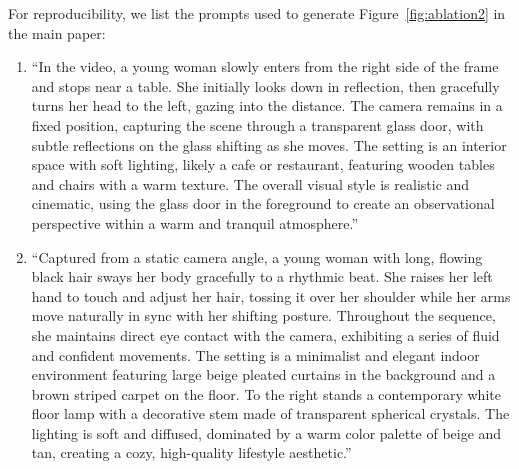 For reproducibility, we list the prompts used to generate Figure~\ref{fig:ablation2} in the main paper:
\begin{enumerate}
\item ``In the video, a young woman slowly enters from the right side of the frame and stops near a table. She initially looks down in reflection, then gracefully turns her head to the left, gazing into the distance. The camera remains in a fixed position, capturing the scene through a transparent glass door, with subtle reflections on the glass shifting as she moves. The setting is an interior space with soft lighting, likely a cafe or restaurant, featuring wooden tables and chairs with a warm texture. The overall visual style is realistic and cinematic, using the glass door in the foreground to create an observational perspective within a warm and tranquil atmosphere.''
% 
\item ``Captured from a static camera angle, a young woman with long, flowing black hair sways her body gracefully to a rhythmic beat. She raises her left hand to touch and adjust her hair, tossing it over her shoulder while her arms move naturally in sync with her shifting posture. Throughout the sequence, she maintains direct eye contact with the camera, exhibiting a series of fluid and confident movements. The setting is a minimalist and elegant indoor environment featuring large beige pleated curtains in the background and a brown striped carpet on the floor. To the right stands a contemporary white floor lamp with a decorative stem made of transparent spherical crystals. The lighting is soft and diffused, dominated by a warm color palette of beige and tan, creating a cozy, high-quality lifestyle aesthetic.''
\end{enumerate}



